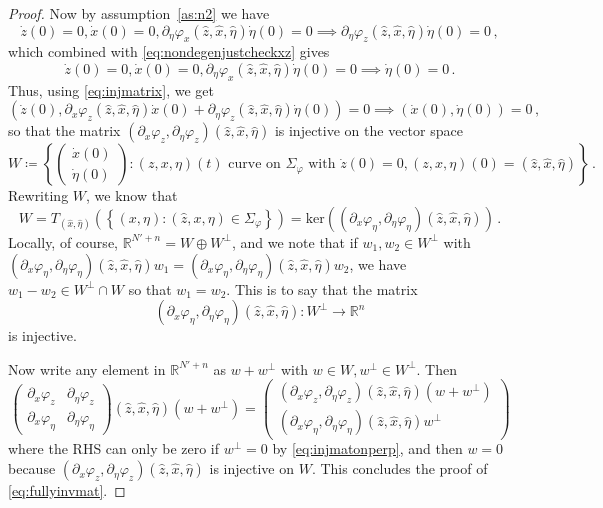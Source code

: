 \documentclass[
	fontsize=11pt, 
	twoside=false, 
	abstract=true, 
	a4paper,
]{scrartcl}
\newcommand{\RR}{\mathbb{R}}
\newcommand{\del}{\partial}
\begin{document}
\begin{proof}
	Now by assumption~\ref{as:n2} we have
	\[
		\dot z(0)=0, \dot x(0)=0,\del_\eta \varphi_x(\hat z, \hat x, \hat \eta) \dot \eta(0) =0 \implies \del_\eta\varphi_z(\hat z,\hat x,\hat \eta)\dot \eta(0) = 0\,,%
	\]
	which combined with \cref{eq:nondegenjustcheckxz} gives
	\[
		\dot z(0)=0, \dot x(0)=0,\del_\eta \varphi_x(\hat z, \hat x, \hat \eta) \dot \eta(0) =0 \implies \dot\eta(0)=0\,.
	\]
	Thus, using \cref{eq:injmatrix}, we get
	\[
		(\dot z(0), %
		\del_x\varphi_{z}(\hat z, \hat x, \hat \eta)\dot x(0) +  \del_\eta\varphi_{z}(\hat z, \hat x, \hat \eta)\dot\eta(0)) = 0 \implies (\dot x(0), \dot\eta(0)) =0\,,
	\]
	so that the matrix $(\del_x\varphi_z, \del_\eta\varphi_z)(\hat z, \hat x, \hat \eta)$ is injective on the vector space
	\[
		W\coloneqq \left\{\begin{pmatrix}\dot x(0)\\ \dot\eta(0)\end{pmatrix} \colon (z,x,\eta)(t) \text{ curve on } \Sigma_\varphi\text{ with } \dot z(0)=0, (z,x,\eta)(0)=(\hat z,\hat x,\hat \eta)\right\}\,.
	\]
	Rewriting $W$, %
	we know that
	\[
		W = T_{(\hat x,\hat \eta)}\left(\left\{(x,\eta)\colon (\hat z, x,\eta) \in \Sigma_\varphi\right\}\right) = \mathrm{ker}((\del_x\varphi_\eta,\del_\eta\varphi_\eta)(\hat z,\hat x,\hat\eta))\,. 
	\]
	Locally, of course, $\RR^{N'+n} = W \oplus W^\perp$, and we note that if $w_1,w_2\in W^\perp$ with $(\del_x\varphi_\eta,\del_\eta\varphi_\eta)(\hat z, \hat x,\hat \eta) w_1 = (\del_x\varphi_\eta,\del_\eta\varphi_\eta)(\hat z, \hat x,\hat \eta) w_2$, we have $w_1-w_2 \in W^\perp \cap W$ so that $w_1=w_2$. This is to say that the matrix
	\begin{equation}\label{eq:injmatonperp}
		(\del_x\varphi_\eta,\del_\eta\varphi_\eta)(\hat z, \hat x,\hat \eta)\colon W^\perp \to \RR^n
	\end{equation}
	is injective. 

	Now write any element in $\RR^{N'+n}$ as $w+ w^\perp$ with $w\in W,w^\perp\in W^\perp$. Then
	\[
		\begin{pmatrix}
			\del_x\varphi_z & \del_\eta\varphi_z \\ 
			\del_x\varphi_\eta & \del_\eta\varphi_\eta
			\end{pmatrix}(\hat z,\hat x,\hat\eta) (w+w^\perp) = \begin{pmatrix}(\del_x\varphi_z,\del_\eta\varphi_z)(\hat z,\hat x,\hat\eta)(w+w^\perp)\\ (\del_x\varphi_\eta,\del_\eta\varphi_\eta)(\hat z,\hat x,\hat\eta)w^\perp\end{pmatrix}
	\]
	where the RHS can only be zero if $w^\perp = 0$ by \cref{eq:injmatonperp}, and then $w=0$ because $(\del_x\varphi_z, \del_\eta\varphi_z)(\hat z, \hat x, \hat \eta)$ is injective on $W$. This concludes the proof of \cref{eq:fullyinvmat}.
\end{proof}
\end{document}
